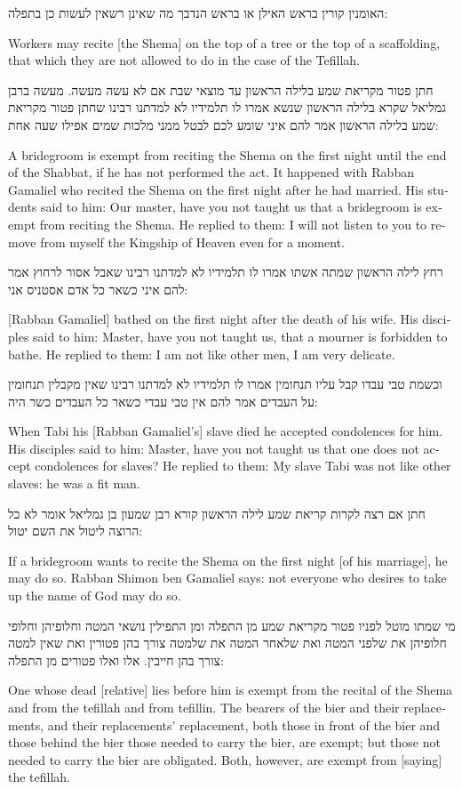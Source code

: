 \documentclass[12pt, openany]{book}
\newcommand{\textblock}[2]{
	{\fontsize{16pt}{20pt}\selectfont #1\\}
	
	\begin{english}
		#2
	\end{english}
	\clearpage
}
\begin{document}
\textblock{האומנין קורין בראש האילן או בראש הנדבך מה שאינן רשאין לעשות כן בתפלה: }{Workers may recite {[the Shema]} on the top of a tree or the top of a scaffolding, that which they are not allowed to do in the case of the Tefillah.}
\textblock{חתן פטור מקריאת שמע בלילה הראשון עד מוצאי שבת אם לא עשה מעשה. מעשה ברבן גמליאל שקרא בלילה הראשון שנשא אמרו לו תלמידיו לא למדתנו רבינו שחתן פטור מקריאת שמע בלילה הראשון אמר להם איני שומע לכם לבטל ממני מלכות שמים אפילו שעה אחת: }{A bridegroom is exempt from reciting the Shema on the first night until the end of the Shabbat, if he has not performed the act. It happened with Rabban Gamaliel who recited the Shema on the first night after he had married.  His students said to him: Our master, have you not taught us that a bridegroom is exempt from reciting the Shema. He replied to them: I will not listen to you to remove from myself the Kingship of Heaven even for a moment.}
\textblock{רחץ לילה הראשון שמתה אשתו אמרו לו תלמידיו לא למדתנו רבינו שאבל אסור לרחוץ אמר להם איני כשאר כל אדם אסטניס אני: }{{[Rabban Gamaliel]} bathed on the first night after the death of his wife. His disciples said to him: Master, have you not taught us, that a mourner is forbidden to bathe. He replied to them: I am not like other men, I am very delicate.}
\textblock{וכשמת טבי עבדו קבל עליו תנחומין אמרו לו תלמידיו לא למדתנו רבינו שאין מקבלין תנחומין על העבדים אמר להם אין טבי עבדי כשאר כל העבדים כשר היה: }{When Tabi his {[Rabban Gamaliel’s]} slave died he accepted condolences for him. His disciples said to him: Master, have you not taught us that one does not accept condolences for slaves? He replied to them: My slave Tabi was not like other slaves: he was a fit man.}
\textblock{חתן אם רצה לקרות קריאת שמע לילה הראשון קורא רבן שמעון בן גמליאל אומר לא כל הרוצה ליטול את השם יטול: }{If a bridegroom wants to recite the Shema on the first night {[of his marriage]}, he may do so. Rabban Shimon ben Gamaliel says: not everyone who desires to take up the name of God may do so.}
\textblock{מי שמתו מוטל לפניו פטור מקריאת שמע מן התפלה ומן התפילין נושאי המטה וחלופיהן וחלופי חלופיהן את שלפני המטה ואת שלאחר המטה את שלמטה צורך בהן פטורין ואת שאין למטה צורך בהן חייבין. אלו ואלו פטורים מן התפלה: }{One whose dead {[relative]} lies before him is exempt from the recital of the Shema and from the tefillah and from tefillin. The bearers of the bier and their replacements, and their replacements’ replacement, both those in front of the bier and those behind the bier those needed to carry the bier, are exempt; but those not needed to carry the bier are obligated. Both, however, are exempt from {[saying]} the tefillah.}
\end{document}
